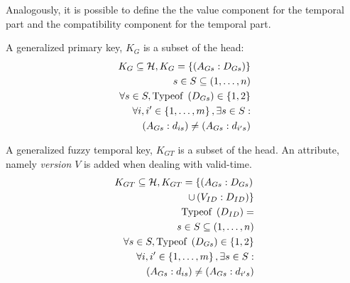 Analogously, it is possible to define the the value component for the temporal part and the compatibility component for the temporal part. 

\begin{definition}
\label{def:generalized-primary-key}
A generalized primary key, $K_G$ is a subset of the head:
\begin{align}
\label{eq:generalized-primary-key}
K_G \subseteq \mathcal{H}, K_G = \left \lbrace  \left(A_{Gs}:D_{Gs} \right) \right \rbrace \\
\nonumber
s\in S \subseteq \left(1, \ldots, n \right) \\
\nonumber
\forall s \in S, \text{Typeof } \left(D_{Gs} \right) \in \left \lbrace 1, 2 \right \rbrace \\
\nonumber
\forall i, i' \in \left \lbrace 1, \ldots, m\right \rbrace , \exists s \in S: \\
\nonumber
\left(A_{Gs}:d_{is} \right) \neq \left(A_{Gs}:d_{i's} \right)
\end{align}
\end{definition}


\begin{definition}
\label{def:generalized-fuzzy-temporal-key}
A generalized fuzzy temporal key, $K_{GT}$ is a subset of the head. An attribute, namely \emph{version} $V$ is added when dealing with valid-time.
\begin{align}
\label{eq:generalized-fuzzy-temporal-key}
K_{GT} \subseteq \mathcal{H}, K_{GT} = \left \lbrace  \left(A_{Gs}:D_{Gs} \right) \right.  \\
\nonumber
 \left. \cup  \left(V_{ID}:D_{ID} \right)	\right \rbrace \\
\nonumber
\text{Typeof }\left(D_{ID} \right) = \\
\nonumber
s\in S \subseteq \left(1, \ldots, n \right) \\
\nonumber
\forall s \in S, \text{Typeof } \left(D_{Gs} \right) \in \left \lbrace 1, 2 \right \rbrace \\
\nonumber
\forall i, i' \in \left \lbrace 1, \ldots, m\right \rbrace , \exists s \in S: \\
\nonumber
\left(A_{Gs}:d_{is} \right) \neq \left(A_{Gs}:d_{i's} \right)
\end{align}

\end{definition}


\begin{example}


\end{example}



